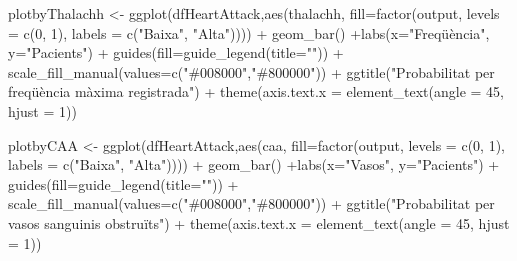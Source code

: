 \documentclass[
]{article}
\newenvironment{Shaded}{\begin{snugshade}}{\end{snugshade}}
\newcommand{\AttributeTok}[1]{\textcolor[rgb]{0.80,0.80,0.80}{#1}}
\newcommand{\DecValTok}[1]{\textcolor[rgb]{0.86,0.86,0.80}{#1}}
\newcommand{\FunctionTok}[1]{\textcolor[rgb]{0.94,0.94,0.56}{#1}}
\newcommand{\NormalTok}[1]{\textcolor[rgb]{0.80,0.80,0.80}{#1}}
\newcommand{\OtherTok}[1]{\textcolor[rgb]{0.94,0.94,0.56}{#1}}
\newcommand{\SpecialCharTok}[1]{\textcolor[rgb]{0.86,0.64,0.64}{#1}}
\newcommand{\StringTok}[1]{\textcolor[rgb]{0.80,0.58,0.58}{#1}}
\begin{document}
\begin{Shaded}
\begin{Highlighting}[]
\NormalTok{plotbyThalachh }\OtherTok{\textless{}{-}} \FunctionTok{ggplot}\NormalTok{(dfHeartAttack,}\FunctionTok{aes}\NormalTok{(thalachh, }\AttributeTok{fill=}\FunctionTok{factor}\NormalTok{(output, }\AttributeTok{levels =} \FunctionTok{c}\NormalTok{(}\DecValTok{0}\NormalTok{, }\DecValTok{1}\NormalTok{), }\AttributeTok{labels =} \FunctionTok{c}\NormalTok{(}\StringTok{"Baixa"}\NormalTok{, }\StringTok{"Alta"}\NormalTok{)))) }\SpecialCharTok{+} 
                    \FunctionTok{geom\_bar}\NormalTok{() }\SpecialCharTok{+}\FunctionTok{labs}\NormalTok{(}\AttributeTok{x=}\StringTok{"Freqüència"}\NormalTok{, }\AttributeTok{y=}\StringTok{"Pacients"}\NormalTok{) }\SpecialCharTok{+} 
                    \FunctionTok{guides}\NormalTok{(}\AttributeTok{fill=}\FunctionTok{guide\_legend}\NormalTok{(}\AttributeTok{title=}\StringTok{""}\NormalTok{)) }\SpecialCharTok{+} 
                  \FunctionTok{scale\_fill\_manual}\NormalTok{(}\AttributeTok{values=}\FunctionTok{c}\NormalTok{(}\StringTok{"\#008000"}\NormalTok{,}\StringTok{"\#800000"}\NormalTok{)) }\SpecialCharTok{+} 
                    \FunctionTok{ggtitle}\NormalTok{(}\StringTok{"Probabilitat per freqüència màxima registrada"}\NormalTok{) }\SpecialCharTok{+}
          \FunctionTok{theme}\NormalTok{(}\AttributeTok{axis.text.x =} \FunctionTok{element\_text}\NormalTok{(}\AttributeTok{angle =} \DecValTok{45}\NormalTok{, }\AttributeTok{hjust =} \DecValTok{1}\NormalTok{))}

\NormalTok{plotbyCAA }\OtherTok{\textless{}{-}} \FunctionTok{ggplot}\NormalTok{(dfHeartAttack,}\FunctionTok{aes}\NormalTok{(caa, }\AttributeTok{fill=}\FunctionTok{factor}\NormalTok{(output, }\AttributeTok{levels =} \FunctionTok{c}\NormalTok{(}\DecValTok{0}\NormalTok{, }\DecValTok{1}\NormalTok{), }\AttributeTok{labels =} \FunctionTok{c}\NormalTok{(}\StringTok{"Baixa"}\NormalTok{, }\StringTok{"Alta"}\NormalTok{)))) }\SpecialCharTok{+} 
                    \FunctionTok{geom\_bar}\NormalTok{() }\SpecialCharTok{+}\FunctionTok{labs}\NormalTok{(}\AttributeTok{x=}\StringTok{"Vasos"}\NormalTok{, }\AttributeTok{y=}\StringTok{"Pacients"}\NormalTok{) }\SpecialCharTok{+} 
                    \FunctionTok{guides}\NormalTok{(}\AttributeTok{fill=}\FunctionTok{guide\_legend}\NormalTok{(}\AttributeTok{title=}\StringTok{""}\NormalTok{)) }\SpecialCharTok{+} 
                  \FunctionTok{scale\_fill\_manual}\NormalTok{(}\AttributeTok{values=}\FunctionTok{c}\NormalTok{(}\StringTok{"\#008000"}\NormalTok{,}\StringTok{"\#800000"}\NormalTok{)) }\SpecialCharTok{+} 
                    \FunctionTok{ggtitle}\NormalTok{(}\StringTok{"Probabilitat per vasos sanguinis obstruïts"}\NormalTok{) }\SpecialCharTok{+}
          \FunctionTok{theme}\NormalTok{(}\AttributeTok{axis.text.x =} \FunctionTok{element\_text}\NormalTok{(}\AttributeTok{angle =} \DecValTok{45}\NormalTok{, }\AttributeTok{hjust =} \DecValTok{1}\NormalTok{))}


\end{Highlighting}
\end{Shaded}
\end{document}
